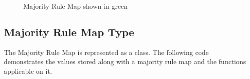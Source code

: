 \documentclass[a4paper,10pt]{article}
\begin{document}
\begin{figure}[h]
\begin{center}
\caption{\label{fig:Majority Rule Map}Majority Rule Map shown in green}
\end{center}
\end{figure}





\newpage
\subsection{Majority Rule Map Type}

The Majority Rule Map is represented as a class. The following code demonstrates the values stored along with a majority rule map and the 
functions applicable on it.
\end{document}
